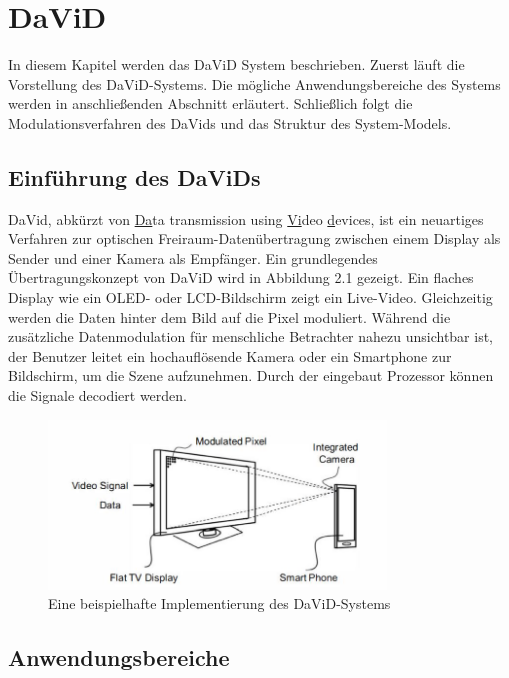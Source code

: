 \chapter{DaViD} \label{cha:David}

In diesem Kapitel werden das DaViD System beschrieben. Zuerst läuft die Vorstellung des DaViD-Systems.  Die mögliche Anwendungsbereiche des Systems werden in anschließenden Abschnitt erläutert. Schließlich folgt die Modulationsverfahren des DaVids und das Struktur des System-Models. 

\section{Einführung des DaViDs} 

DaVid, abkürzt von \uline{Da}ta transmission using \uline{Vi}deo \uline{d}evices, ist ein neuartiges Verfahren zur optischen Freiraum-Datenübertragung zwischen einem Display als Sender und einer Kamera als Empfänger. Ein grundlegendes Übertragungskonzept von DaViD wird in Abbildung 2.1 gezeigt. Ein flaches Display wie ein OLED- oder LCD-Bildschirm zeigt ein Live-Video. Gleichzeitig werden die Daten hinter dem Bild auf die Pixel moduliert. Während die zusätzliche Datenmodulation für menschliche Betrachter nahezu unsichtbar ist, der Benutzer leitet ein hochauflösende Kamera oder ein Smartphone zur Bildschirm, um die Szene aufzunehmen. Durch der eingebaut Prozessor können die Signale decodiert werden.

\begin{figure}[htb]
 \centering 
 \includegraphics[keepaspectratio,width=0.8\textwidth]{images/David1.jpg}
 \caption{Eine beispielhafte Implementierung des DaViD-Systems}
 \label{fig:David1}
\end{figure}

\section{Anwendungsbereiche} 


